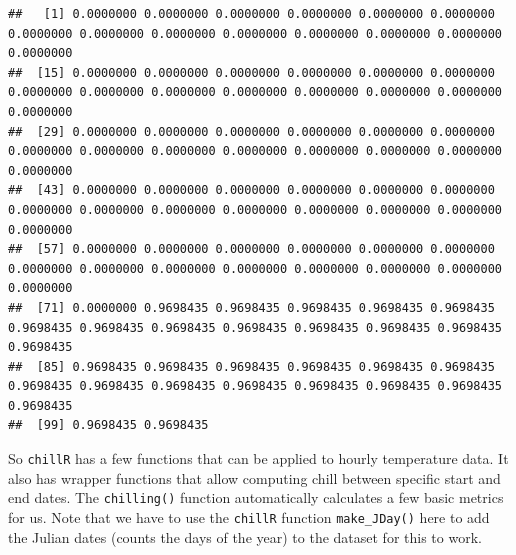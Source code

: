 \documentclass[
]{book}
\newenvironment{Shaded}{\begin{snugshade}}{\end{snugshade}}
\newcommand{\DataTypeTok}[1]{\textcolor[rgb]{0.13,0.29,0.53}{#1}}
\newcommand{\DecValTok}[1]{\textcolor[rgb]{0.00,0.00,0.81}{#1}}
\newcommand{\KeywordTok}[1]{\textcolor[rgb]{0.13,0.29,0.53}{\textbf{#1}}}
\newcommand{\NormalTok}[1]{#1}
\newcommand{\OperatorTok}[1]{\textcolor[rgb]{0.81,0.36,0.00}{\textbf{#1}}}
\newcommand{\StringTok}[1]{\textcolor[rgb]{0.31,0.60,0.02}{#1}}
\begin{document}
\begin{Shaded}
\end{Shaded}

\begin{verbatim}
##   [1] 0.0000000 0.0000000 0.0000000 0.0000000 0.0000000 0.0000000 0.0000000 0.0000000 0.0000000 0.0000000 0.0000000 0.0000000 0.0000000 0.0000000
##  [15] 0.0000000 0.0000000 0.0000000 0.0000000 0.0000000 0.0000000 0.0000000 0.0000000 0.0000000 0.0000000 0.0000000 0.0000000 0.0000000 0.0000000
##  [29] 0.0000000 0.0000000 0.0000000 0.0000000 0.0000000 0.0000000 0.0000000 0.0000000 0.0000000 0.0000000 0.0000000 0.0000000 0.0000000 0.0000000
##  [43] 0.0000000 0.0000000 0.0000000 0.0000000 0.0000000 0.0000000 0.0000000 0.0000000 0.0000000 0.0000000 0.0000000 0.0000000 0.0000000 0.0000000
##  [57] 0.0000000 0.0000000 0.0000000 0.0000000 0.0000000 0.0000000 0.0000000 0.0000000 0.0000000 0.0000000 0.0000000 0.0000000 0.0000000 0.0000000
##  [71] 0.0000000 0.9698435 0.9698435 0.9698435 0.9698435 0.9698435 0.9698435 0.9698435 0.9698435 0.9698435 0.9698435 0.9698435 0.9698435 0.9698435
##  [85] 0.9698435 0.9698435 0.9698435 0.9698435 0.9698435 0.9698435 0.9698435 0.9698435 0.9698435 0.9698435 0.9698435 0.9698435 0.9698435 0.9698435
##  [99] 0.9698435 0.9698435
\end{verbatim}

So \texttt{chillR} has a few functions that can be applied to hourly temperature data. It also has wrapper functions that allow computing chill between specific start and end dates. The \texttt{chilling()} function automatically calculates a few basic metrics for us. Note that we have to use the \texttt{chillR} function \texttt{make\_JDay()} here to add the Julian dates (counts the days of the year) to the dataset for this to work.

\begin{Shaded}
\end{Shaded}
\end{document}
